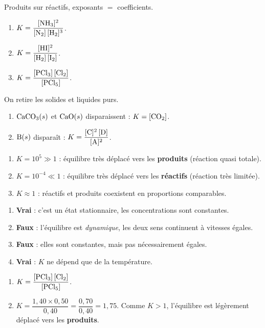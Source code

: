 \documentclass[11pt,a4paper]{article}
\begin{document}
\begin{corrige}
Produits sur réactifs, exposants $=$ coefficients.
\begin{enumerate}[label=\alph*)]
  \item $K = \dfrac{[\ce{NH3}]^{2}}{[\ce{N2}]\,[\ce{H2}]^{3}}$.
  \item $K = \dfrac{[\ce{HI}]^{2}}{[\ce{H2}]\,[\ce{I2}]}$.
  \item $K = \dfrac{[\ce{PCl3}]\,[\ce{Cl2}]}{[\ce{PCl5}]}$.
\end{enumerate}
\end{corrige}

\begin{corrige}
On retire les solides et liquides purs.
\begin{enumerate}[label=\alph*)]
  \item $\ce{CaCO3}(s)$ et $\ce{CaO}(s)$ disparaissent : $K = [\ce{CO2}]$.
  \item $\ce{B}(s)$ disparaît : $K = \dfrac{[\ce{C}]^{2}\,[\ce{D}]}{[\ce{A}]^{2}}$.
\end{enumerate}
\end{corrige}

\begin{corrige}
\begin{enumerate}[label=\alph*)]
  \item $K=10^{5}\gg 1$ : équilibre très déplacé vers les \textbf{produits} (réaction quasi totale).
  \item $K=10^{-4}\ll 1$ : équilibre très déplacé vers les \textbf{réactifs} (réaction très limitée).
  \item $K\approx 1$ : réactifs et produits coexistent en proportions comparables.
\end{enumerate}
\end{corrige}

\begin{corrige}
\begin{enumerate}[label=\alph*)]
  \item \textbf{Vrai} : c'est un état stationnaire, les concentrations sont constantes.
  \item \textbf{Faux} : l'équilibre est \emph{dynamique}, les deux sens continuent à vitesses égales.
  \item \textbf{Faux} : elles sont constantes, mais pas nécessairement égales.
  \item \textbf{Vrai} : $K$ ne dépend que de la température.
\end{enumerate}
\end{corrige}

\begin{corrige}
\begin{enumerate}[label=\alph*)]
  \item $K = \dfrac{[\ce{PCl3}]\,[\ce{Cl2}]}{[\ce{PCl5}]}$.
  \item $K = \dfrac{1{,}40\times 0{,}50}{0{,}40} = \dfrac{0{,}70}{0{,}40} = 1{,}75$. Comme $K>1$, l'équilibre est légèrement déplacé vers les \textbf{produits}.
\end{enumerate}
\end{corrige}
\end{document}
